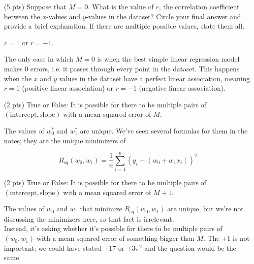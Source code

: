 \documentclass[11pt]{article}
\begin{document}
\begin{prob}[(14 pts)]
\begin{subprob}(5 pts) Suppose that $M = 0$. What is the value of $r$, the correlation coefficient between the $x$-values and $y$-values in the dataset? $\boxed{\text{Circle}}$ your final answer and provide a brief explanation. If there are multiple possible values, state them all.  \\

\emptybox{4cm}

\begin{solution}
$r = 1$ or $r = -1$.

The only case in which $M = 0$ is when the best simple linear regression model makes 0 errors, i.e. it passes through every point in the dataset. This happens when the $x$ and $y$ values in the dataset have a perfect linear association, meaning $r = 1$ (positive linear association) or $r = -1$ (negative linear association).
\end{solution}
\end{subprob}

\begin{subprob}(2 pts) True or False: It is possible for there to be multiple pairs of $(\text{intercept}, \text{slope})$ with a mean squared error of $M$.

 

\begin{solution}
The values of $w_0^*$ and $w_1^*$ are unique. We've seen several formulas for them in the notes; they are the unique minimizers of

$$R_\text{sq}(w_0, w_1) = \frac{1}{n} \sum_{i=1}^n (y_i - (w_0 + w_1 x_i))^2$$
\end{solution}

\end{subprob}

\begin{subprob}(2 pts)
True or False: It is possible for there to be multiple pairs of $(\text{intercept}, \text{slope})$ with a mean squared error of $M + 1$.

 

\begin{solution}
The values of $w_0$ and $w_1$ that minimize $R_\text{sq}(w_0, w_1)$ are unique, but we're not discussing the minimizers here, so that fact is irrelevant. \\

Instead, it's asking whether it's possible for there to be multiple pairs of $(w_0, w_1)$ with a mean squared error of something bigger than $M$. The $+1$ is not important; we could have stated $+17$ or $+3\pi^2$ and the question would be the same. \\


\end{solution}
\end{subprob}
\end{prob}
\end{document}
